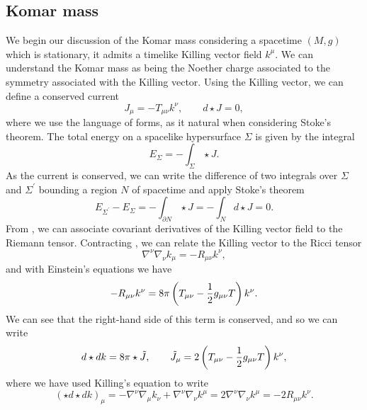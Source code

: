 \subsection{Komar mass}
\label{sec:komarmass}
We begin our discussion of the Komar mass considering a spacetime $(M,g)$ which is stationary, \ie it admits a timelike Killing vector field $k^\mu$. We can understand the Komar mass as being the Noether charge associated to the symmetry associated with the Killing vector. Using the Killing vector, we can define a conserved current
\begin{equation*}
	J_\mu = - T_{\mu \nu} k^\nu, \qquad d \star J = 0,
\end{equation*}
where we use the language of forms, as it natural when considering Stoke's theorem. The total energy on a spacelike hypersurface $\Sigma$ is given by the integral
\begin{equation*}
	E_\Sigma = - \int_\Sigma \star J.
\end{equation*}
As the current is conserved, we can write the difference of two integrals over $\Sigma$ and $\Sigma^\prime$ bounding a region $N$ of spacetime and apply Stoke's theorem
\begin{equation*}
	E_{\Sigma^\prime} - E_\Sigma = - \int_{\partial N} \star J = - \int_{N} d \star J = 0.
\end{equation*}
From , we can associate covariant derivatives of the Killing vector field to the Riemann tensor. Contracting , we can relate the Killing vector to the Ricci tensor
\begin{equation*}
	\nabla^\nu \nabla_\nu k_\mu = - R_{\mu \nu} k^\nu,
\end{equation*}
and with Einstein's equations we have
\begin{equation*}
	- R_{\mu \nu} k^\nu =  8 \pi \left( T_{\mu \nu} - \frac{1}{2} g_{\mu \nu} T \right) k^\nu.
\end{equation*}
We can see that the right-hand side of this term is conserved, and so we can write
\begin{equation*}
	d \star dk = 8 \pi \star \tilde{J}, \qquad \tilde{J}_\mu = 2 \left( T_{\mu \nu} - \frac{1}{2} g_{\mu \nu} T \right) k^\nu,
\end{equation*}
where we have used Killing's equation to write
\begin{equation*}
	(\star d \star d k)_\mu = - \nabla^\nu \nabla_\mu k_\nu + \nabla^\nu \nabla_\nu k^\mu = 2 \nabla^\nu \nabla_\nu k^\mu = - 2 R_{\mu \nu} k^\nu.
\end{equation*}
